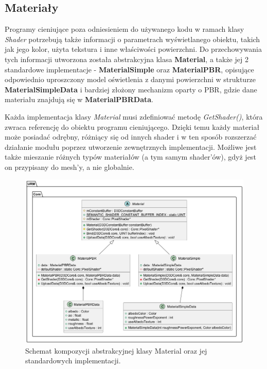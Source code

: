 \subsection{Materiały}
	Programy cieniujące poza odniesieniem do używanego kodu w ramach klasy \textit{Shader} potrzebują także informacji o parametrach wyświetlanego obiektu, takich jak jego kolor, użyta tekstura i inne właściwości powierzchni.	Do przechowywania tych informacji utworzona została abstrakcyjna klasa \textbf{Material}, a także jej 2 standardowe implementacje - \textbf{MaterialSimple} oraz \textbf{MaterialPBR}, opisujące odpowiednio uproszczony model oświetlenia z danymi powierzchni w strukturze \textbf{MaterialSimpleData} i bardziej złożony mechanizm oparty o PBR, gdzie dane materiału znajdują się w \textbf{MaterialPBRData}.
	
	Każda implementacja klasy \textit{Material} musi zdefiniować metodę \textit{GetShader()}, która zwraca referencję do obiektu programu cieniującego. Dzięki temu każdy materiał może posiadać odrębny, różniący się od innych shader i w ten sposób rozszerzać działanie modułu poprzez utworzenie zewnętrznych implementacji. Możliwe jest także mieszanie różnych typów materiałów (a tym samym shader'ów), gdyż jest on przypisany do mesh'y, a nie globalnie.

	\vfill
	\clearpage
		
	\begin{figure}[h!]
		\centering
		\includegraphics[width=\textwidth]{images/UML/materials.png}
		\caption{Schemat kompozycji abstrakcyjnej klasy Material oraz jej standardowych implementacji.}
		\label{UML_Material}
	\end{figure}

